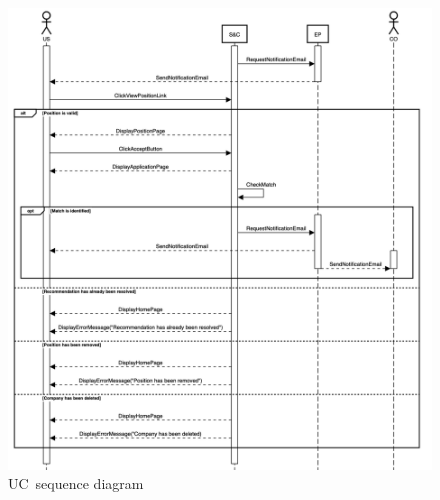 \begin{figure}
    \centering
    \includegraphics[width=16cm]{images/sequence-diagrams/student-accepts-recommendation.png}
    \caption{UC\theuc\ sequence diagram}
\end{figure}



